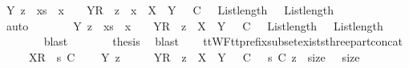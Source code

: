 \ {\isachardoublequoteopen}{\isasymexists}Y\ z\ {\isasymrho}\ xs\ {\isacharat}\ {\isacharbrackleft}x{\isacharbrackright}\ {\isacharequal}\ {\isasymrho}\ {\isacharat}\ {\isacharbrackleft}{\isacharbrackleft}Y{\isacharbrackright}\isactrlsub R{\isacharbrackright}\ {\isacharat}\ z\ {\isacharat}\ {\isacharbrackleft}x{\isacharbrackright}\ {\isasymand}\ X\ {\isasymsubseteq}\ Y\ {\isasymand}\ {\isasymrho}\ {\isasymlesssim}\isactrlsub C\ {\isasymrho}\ {\isasymand}\ List{\isachardot}length\ {\isasymrho}\ {\isacharequal}\ List{\isachardot}length\ {\isasymrho}{\isachardoublequoteclose}\isanewline
\ \ \ \ \ \ \isamarkupfalse%
\ auto\isanewline
\ \ \ \ \isamarkupfalse%
\ \isamarkupfalse%
\ {\isachardoublequoteopen}{\isasymexists}Y\ z\ {\isasymrho}\ xs\ {\isacharat}\ {\isacharbrackleft}x{\isacharbrackright}\ {\isacharequal}\ {\isasymrho}\ {\isacharat}\ {\isacharbrackleft}{\isacharbrackleft}Y{\isacharbrackright}\isactrlsub R{\isacharbrackright}\ {\isacharat}\ z\ {\isasymand}\ X\ {\isasymsubseteq}\ Y\ {\isasymand}\ {\isasymrho}\ {\isasymlesssim}\isactrlsub C\ {\isasymrho}\ {\isasymand}\ List{\isachardot}length\ {\isasymrho}\ {\isacharequal}\ List{\isachardot}length\ {\isasymrho}{\isachardoublequoteclose}\isanewline
\ \ \ \ \ \ \isamarkupfalse%
\ blast\isanewline
\ \ \ \ \isamarkupfalse%
\ \isamarkupfalse%
\ {\isacharquery}thesis\ \isamarkupfalse%
\ blast\isanewline
\ \ \isamarkupfalse%
\isanewline
{}\isamarkupfalse%
%
\endisatagproof
{\isafoldproof}%
%
\isadelimproof
\isanewline
%
\endisadelimproof
\isanewline
{}\isamarkupfalse%
\ ttWF{\isacharunderscore}tt{\isacharunderscore}prefix{\isacharunderscore}subset{\isacharunderscore}exists{\isacharunderscore}three{\isacharunderscore}part{\isacharunderscore}concat{\isacharcolon}\isanewline
\ \ \ {\isachardoublequoteopen}{\isasymrho}\ {\isacharat}\ {\isacharbrackleft}{\isacharbrackleft}X{\isacharbrackright}\isactrlsub R{\isacharbrackright}\ {\isacharat}\ s\ {\isasymlesssim}\isactrlsub C\ {\isasymsigma}{\isachardoublequoteclose}\isanewline
\ \ \ {\isachardoublequoteopen}{\isasymexists}Y\ z\ {\isasymrho}\ {\isasymsigma}\ {\isacharequal}\ {\isasymrho}\ {\isacharat}\ {\isacharparenleft}{\isacharbrackleft}{\isacharbrackleft}Y{\isacharbrackright}\isactrlsub R{\isacharbrackright}\ {\isacharat}\ z{\isacharparenright}\ {\isasymand}\ X\ {\isasymsubseteq}\ Y\ {\isasymand}\ {\isasymrho}\ {\isasymlesssim}\isactrlsub C\ {\isasymrho}\ {\isasymand}\ s\ {\isasymlesssim}\isactrlsub C\ z\ {\isasymand}\ size\ {\isasymrho}\ {\isacharequal}\ size\ {\isasymrho}{\isachardoublequoteclose}\isanewline
